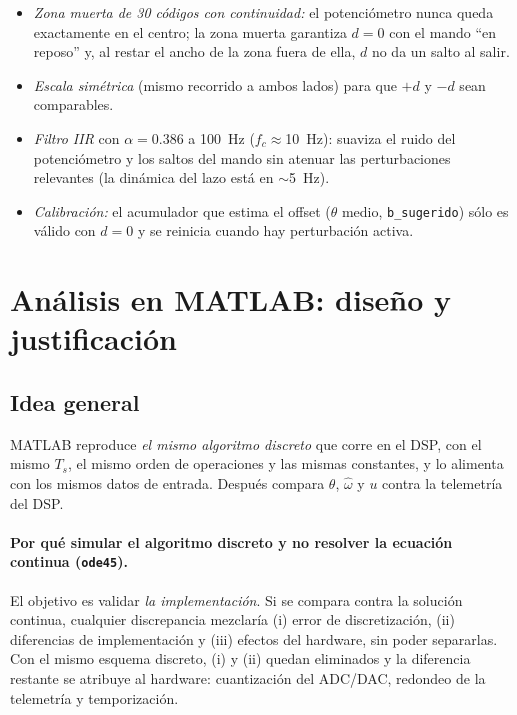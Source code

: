 \documentclass[11pt,a4paper]{article}
\begin{document}
\begin{itemize}[leftmargin=1.6em]
\item \emph{Zona muerta de 30 c\'odigos con continuidad:} el potenci\'ometro nunca queda exactamente en el
centro; la zona muerta garantiza $d=0$ con el mando ``en reposo'' y, al restar el ancho de la zona fuera de ella,
$d$ no da un salto al salir.
\item \emph{Escala sim\'etrica} (mismo recorrido a ambos lados) para que $+d$ y $-d$ sean comparables.
\item \emph{Filtro IIR} con $\alpha=0.386$ a 100~Hz ($f_c\approx$10~Hz): suaviza el ruido del potenci\'ometro y los
saltos del mando sin atenuar las perturbaciones relevantes (la din\'amica del lazo est\'a en $\sim$5~Hz).
\item \emph{Calibraci\'on:} el acumulador que estima el offset ($\theta$ medio, \texttt{b\_sugerido}) s\'olo es
v\'alido con $d=0$ y se reinicia cuando hay perturbaci\'on activa.
\end{itemize}

\section{An\'alisis en MATLAB: dise\~no y justificaci\'on}\label{sec:matlab}
\subsection{Idea general}
MATLAB reproduce \emph{el mismo algoritmo discreto} que corre en el DSP, con el mismo $T_s$, el mismo orden de
operaciones y las mismas constantes, y lo alimenta con los mismos datos de entrada. Despu\'es compara
$\theta$, $\hat\omega$ y $u$ contra la telemetr\'ia del DSP.

\paragraph{Por qu\'e simular el algoritmo discreto y no resolver la ecuaci\'on continua (\texttt{ode45}).}
El objetivo es validar \emph{la implementaci\'on}. Si se compara contra la soluci\'on continua, cualquier
discrepancia mezclar\'ia (i) error de discretizaci\'on, (ii) diferencias de implementaci\'on y (iii) efectos del hardware,
sin poder separarlas. Con el mismo esquema discreto, (i) y (ii) quedan eliminados y la diferencia restante
se atribuye al hardware: cuantizaci\'on del ADC/DAC, redondeo de la telemetr\'ia y temporizaci\'on.
\end{document}
